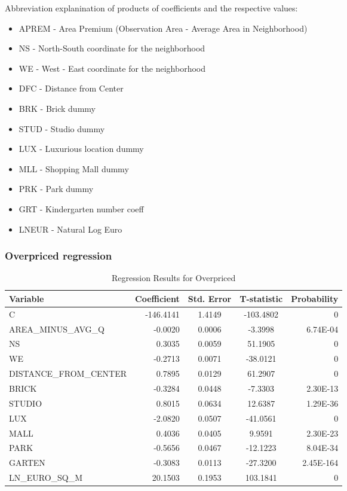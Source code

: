 \documentclass[]{article}
\begin{document}
Abbreviation explanination of products of coefficients and the respective values:
\begin{itemize}
	\item[] APREM - Area Premium (Observation Area - Average Area in Neighborhood)
	\item[] NS - North-South coordinate for the neighborhood
	\item[] WE - West - East coordinate for the neighborhood
	\item[] DFC - Distance from Center
	\item[] BRK - Brick dummy
	\item[] STUD - Studio dummy
	\item[] LUX - Luxurious location dummy
	\item[] MLL - Shopping Mall dummy
	\item[] PRK - Park dummy
	\item[] GRT - Kindergarten number coeff
	\item[] LNEUR - Natural Log Euro
\end{itemize}

\subsubsection{Overpriced regression}
\begin{table}[h!]
	\centering
	\caption{Regression Results for Overpriced}
	\begin{tabular}{lrccr}
		\hline
		Variable & Coefficient & Std. Error & T-statistic & Probability \\
		\hline
		C                      & -146.4141 & 1.4149 & -103.4802 & 0         \\
		AREA\_MINUS\_AVG\_Q    & -0.0020   & 0.0006 & -3.3998   & 6.74E-04  \\
		NS                     & 0.3035    & 0.0059 & 51.1905   & 0         \\
		WE                     & -0.2713   & 0.0071 & -38.0121  & 0         \\
		DISTANCE\_FROM\_CENTER & 0.7895    & 0.0129 & 61.2907   & 0         \\
		BRICK                  & -0.3284   & 0.0448 & -7.3303   & 2.30E-13  \\
		STUDIO                 & 0.8015    & 0.0634 & 12.6387   & 1.29E-36  \\
		LUX                    & -2.0820   & 0.0507 & -41.0561  & 0         \\
		MALL                   & 0.4036    & 0.0405 & 9.9591    & 2.30E-23  \\
		PARK                   & -0.5656   & 0.0467 & -12.1223  & 8.04E-34  \\
		GARTEN                 & -0.3083   & 0.0113 & -27.3200  & 2.45E-164 \\
		LN\_EURO\_SQ\_M        & 20.1503   & 0.1953 & 103.1841  & 0         \\
		\hline
	\end{tabular}
\end{table}
\end{document}
